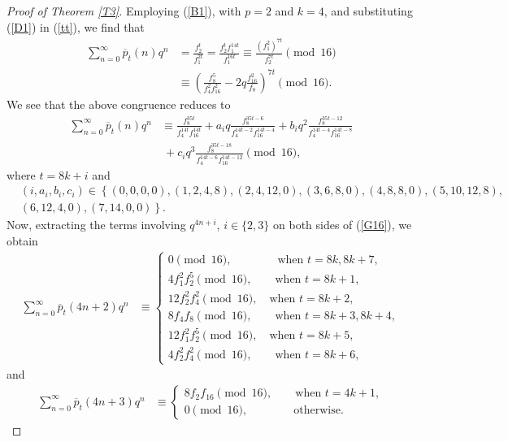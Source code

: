 \documentclass[12pt,reqno,a4paper]{amsart}
\numberwithin{equation}{section}
\begin{document}
 \begin{proof}[Proof of Theorem \ref{T3}]
 Employing (\ref{B1}), with $p=2$ and $k=4$, and substituting  (\ref{D1}) in (\ref{tt}), we find that
  \begin{align*}
       \sum_{n=0}^\infty\overline{p}_{t}(n)q^n&=\frac{f_2^t}{f_1^{2t}}= \frac{f_2^tf_1^{14t}}{f_1^{16t}}\equiv \frac{(f_1^{2})^{7t}}{f_2^{7t}}\pmod{16}\\
       & \equiv \left(\frac{f_8^5}{f_4^2f_{16}^2}-2q\frac{f_{16}^2}{f_8}\right)^{7t}\pmod{16}.
         \end{align*}
  We see that the above congruence reduces to
  \begin{align}
 \sum_{n=0}^\infty\overline{p}_{t}(n)q^n&\equiv \frac{f_8^{35t}}{f_4^{14t}f_{16}^{14t}}+a_iq\frac{f_8^{35t-6}}{f_4^{14t-2}f_{16}^{14t-4}}+b_iq^2\frac{f_8^{35t-12}}{f_4^{14t-4}f_{16}^{14t-8}}\nonumber\\&~+c_iq^3\frac{f_8^{35t-18}}{f_4^{14t-6}f_{16}^{14t-12}}\pmod{16}, \label{G16}
\end{align}
where $t=8k+i$ and 
\begin{align*}
&(i, a_i, b_i, c_i)\in\left\{(0,0,0,0),(1,2,4,8),(2,4,12,0),(3,6,8,0),(4,8,8,0),(5,10,12,8),\right. \\&\left.(6,12,4,0),(7,14,0,0)\right\}.
  \end{align*}
 Now, extracting the terms involving  $q^{4n+i}$, $i\in\{2, 3\}$ on both sides of (\ref{G16}), we obtain
     \begin{align}
 \label{C17}\sum_{n=0}^\infty\overline{p}_{t}(4n+2)q^n&\equiv \begin{cases}
 0\pmod{16}, \qquad\qquad \text{when $t=8k,8k+7,$}\\
     4f_1^2f_2^5 \pmod{16},\qquad \text{when $t=8k+1,$}\\
      12f_2^2f_{4}^2 \pmod{16},\quad \text{when $t=8k+2$, }\\
      8f_{4}f_8 \pmod{16},\qquad \text{when $t=8k+3,8k+4,$}\\
      12f_1^2f_2^5 \pmod{16},\quad \text{when $t=8k+5,$}\\
      4f_2^2f_{4}^2 \pmod{16},\qquad \text{when $t=8k+6$, }
   \end{cases}
   \end{align}
   and
   \begin{align}
     \label{C18} \sum_{n=0}^\infty\overline{p}_{t}(4n+3)q^n&\equiv \begin{cases}
   8f_2f_{16}\pmod{16},\qquad \text{when $t=4k+1,$}\\
       0 \pmod{16},\qquad\qquad \text{otherwise}.

\end{cases}
\end{align}
\end{proof}
\end{document}
